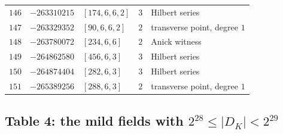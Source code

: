 \documentclass[11pt]{article}
\begin{document}
\begin{center}
\begin{longtable}{r r l c l}
$146$ & $-263310215$ & $[174,6,6,2]$ & $3$ & Hilbert series\\
$147$ & $-263329352$ & $[90,6,6,2]$ & $2$ & transverse point, degree $1$\\
$148$ & $-263780072$ & $[234,6,6]$ & $2$ & Anick witness\\
$149$ & $-264862580$ & $[456,6,3]$ & $3$ & Hilbert series\\
$150$ & $-264874404$ & $[282,6,3]$ & $3$ & Hilbert series\\
$151$ & $-265389256$ & $[288,6,3]$ & $2$ & transverse point, degree $1$\\
\end{longtable}
\end{center}

\subsection*{Table 4: the mild fields with $2^{28}\le|D_K|<2^{29}$}
\end{document}
